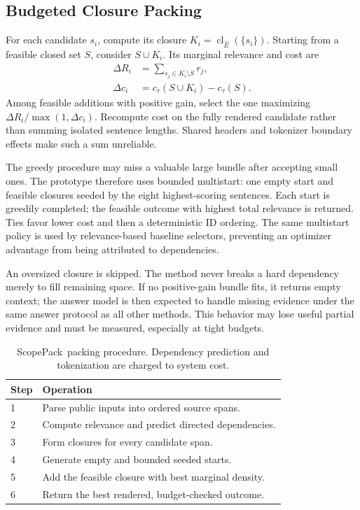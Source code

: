 \documentclass[10pt,twocolumn]{article}
\newcommand{\method}{ScopePack}
\newcommand{\cl}{\operatorname{cl}}
\begin{document}
\subsection{Budgeted Closure Packing}
For each candidate $s_i$, compute its closure $K_i=\cl_{\widehat E}(\{s_i\})$. Starting from a feasible closed set $S$, consider $S\cup K_i$. Its marginal relevance and cost are
\begin{align}
 \Delta R_i &= \sum_{s_j\in K_i\setminus S}r_j,\\
 \Delta c_i &= c_\tau(S\cup K_i)-c_\tau(S).
\end{align}
Among feasible additions with positive gain, select the one maximizing $\Delta R_i/\max(1,\Delta c_i)$. Recompute cost on the fully rendered candidate rather than summing isolated sentence lengths. Shared headers and tokenizer boundary effects make such a sum unreliable.

The greedy procedure may miss a valuable large bundle after accepting small ones. The prototype therefore uses bounded multistart: one empty start and feasible closures seeded by the eight highest-scoring sentences. Each start is greedily completed; the feasible outcome with highest total relevance is returned. Ties favor lower cost and then a deterministic ID ordering. The same multistart policy is used by relevance-based baseline selectors, preventing an optimizer advantage from being attributed to dependencies.

An oversized closure is skipped. The method never breaks a hard dependency merely to fill remaining space. If no positive-gain bundle fits, it returns empty context; the answer model is then expected to handle missing evidence under the same answer protocol as all other methods. This behavior may lose useful partial evidence and must be measured, especially at tight budgets.

\begin{table}[t]
\centering\small
\begin{tabularx}{\columnwidth}{lX}
\toprule
Step & Operation \\
\midrule
1 & Parse public inputs into ordered source spans.\\
2 & Compute relevance and predict directed dependencies.\\
3 & Form closures for every candidate span.\\
4 & Generate empty and bounded seeded starts.\\
5 & Add the feasible closure with best marginal density.\\
6 & Return the best rendered, budget-checked outcome.\\
\bottomrule
\end{tabularx}
\caption{\method\ packing procedure. Dependency prediction and tokenization are charged to system cost.}
\end{table}
\end{document}
